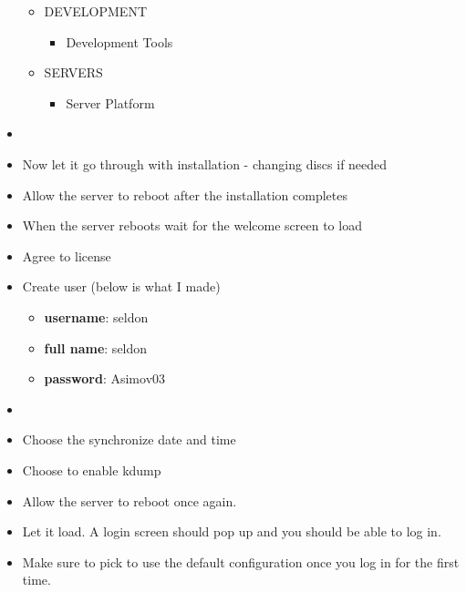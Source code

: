 \begin{itemize}
\begin{itemize}
\begin{itemize}
	\end{itemize}
\item{DEVELOPMENT}
	\begin{itemize}
	\item{Development Tools}
	\end{itemize}
\item{SERVERS}
	\begin{itemize}
	\item{Server Platform}
	\end{itemize}
\end{itemize}
\item{\con}
\item{Now let it go through with installation - changing discs if needed}
\item{Allow the server to reboot after the installation completes}
\item{When the server reboots wait for the welcome screen to load \con}
\item{Agree to license \con}
\item{Create user (below is what I made)}
\begin{itemize}
\item{\textbf{username}: seldon}
\item{\textbf{full name}: seldon}
\item{\textbf{password}: Asimov03}
\end{itemize}
\item{\con}
\item{Choose the synchronize date and time \con}
\item{Choose to enable kdump}
\item{Allow the server to reboot once again.}
\item{Let it load. A login screen should pop up and you should be able to log in.}
\item{Make sure to pick to use the default configuration once you log in for the first time.}
\end{itemize}

\newpage